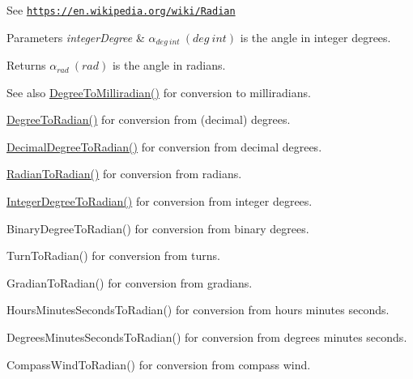 See \href{https://en.wikipedia.org/wiki/Radian}{\tt https\+://en.\+wikipedia.\+org/wiki/\+Radian} 
\begin{DoxyParams}{Parameters}
{\em integer\+Degree} & $\alpha_{deg\ int}\ (deg\ int)$ is the angle in integer degrees. \\
\hline
\end{DoxyParams}
\begin{DoxyReturn}{Returns}
$\alpha_{rad}\ (rad)$ is the angle in radians. 
\end{DoxyReturn}
\begin{DoxySeeAlso}{See also}
\mbox{\hyperlink{group___e_g_x_math-_angle_conversions-_degree_gae4fa6c2d3805430760783650cfbfdb11}{Degree\+To\+Milliradian()}} for conversion to milliradians. 

\mbox{\hyperlink{group___e_g_x_math-_angle_conversions-_degree_ga48585541b228c852c9d08a9eac3682f0}{Degree\+To\+Radian()}} for conversion from (decimal) degrees. 

\mbox{\hyperlink{group___e_g_x_math-_angle_conversions-_decimal_degree_ga906ee2c83cdf4caa59eb613dc2d5d52a}{Decimal\+Degree\+To\+Radian()}} for conversion from decimal degrees. 

\mbox{\hyperlink{group___e_g_x_math-_angle_conversions-_radian_gae08681bd86b8e7e4325f6c8cb3a0dc37}{Radian\+To\+Radian()}} for conversion from radians. 

\mbox{\hyperlink{group___e_g_x_math-_angle_conversions-_integer_degree_ga05d3368b00ea27b9895de2ffe5c8df38}{Integer\+Degree\+To\+Radian()}} for conversion from integer degrees. 

Binary\+Degree\+To\+Radian() for conversion from binary degrees. 

Turn\+To\+Radian() for conversion from turns. 

Gradian\+To\+Radian() for conversion from gradians. 

Hours\+Minutes\+Seconds\+To\+Radian() for conversion from hours minutes seconds. 

Degrees\+Minutes\+Seconds\+To\+Radian() for conversion from degrees minutes seconds. 

Compass\+Wind\+To\+Radian() for conversion from compass wind. 
\end{DoxySeeAlso}
\mbox{\label{group___e_g_x_math-_angle_conversions-_integer_degree_ga06ddbdada5a3978105c855d4aae735ae}} 
